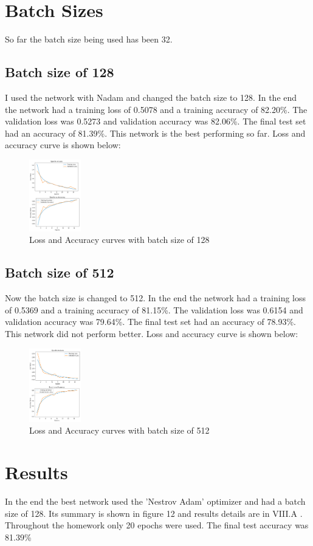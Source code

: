 \documentclass[conference]{IEEEtran}
\begin{document}
    \section{Batch Sizes}

    So far the batch size being used has been 32.

    \subsection{Batch size of 128}

    I used the network with Nadam and changed the batch size to 128. In the end the network had a training loss of
    0.5078 and a training accuracy of 82.20\%. The validation loss was 0.5273 and validation accuracy was 82.06\%. The final test set had
    an accuracy of 81.39\%. This network is the best performing so far. Loss and accuracy curve is shown below:

    \begin{figure}[H]
        \centering
        \captionsetup{justification=centering}
        \centering
            \includegraphics[width=0.2\textwidth]{19.png}
            \caption{Loss and Accuracy curves with batch size of 128}
    \end{figure}

    \subsection{Batch size of 512}

    Now the batch size is changed to 512. In the end the network had a training loss of
    0.5369 and a training accuracy of 81.15\%. The validation loss was 0.6154 and validation accuracy was 79.64\%. The final test set had
    an accuracy of 78.93\%. This network did not perform better. Loss and accuracy curve is shown below:

    \begin{figure}[H]
        \centering
        \captionsetup{justification=centering}
        \centering
            \includegraphics[width=0.2\textwidth]{20.png}
            \caption{Loss and Accuracy curves with batch size of 512}
    \end{figure}

    \section{Results}

    In the end the best network used the 'Nestrov Adam' optimizer and had a batch size of 128. Its summary is shown in figure 12 and results details are in VIII.A . Throughout the
    homework only 20 epochs were used. The final test accuracy was 81.39\%
\end{document}
